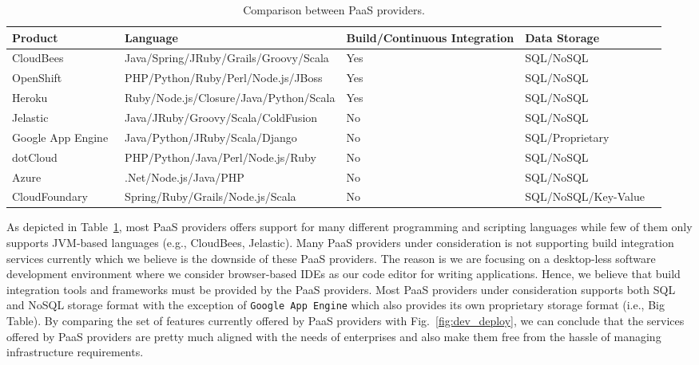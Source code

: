 \documentclass[11pt,fleqn,twoside]{article}
\begin{document}
\begin{table}[h]
\centering
\tiny {
\begin{tabular}{|p{2.3cm}|p{4.5cm}|p{2.5cm}|p{2.5cm}|p{1cm}|}
\hline
\tiny \textbf{Product} & \tiny \textbf{Language} & \tiny \textbf{Build/Continuous Integration} & \tiny \textbf{Data Storage}\\
\hline
CloudBees~\cite{CloudBees_url} & Java/Spring/JRuby/Grails/Groovy/Scala & Yes & SQL/NoSQL \\
\hline
OpenShift~\cite{OpenShift_url} & PHP/Python/Ruby/Perl/Node.js/JBoss & Yes & SQL/NoSQL \\
\hline
Heroku~\cite{Heroku_url} & Ruby/Node.js/Closure/Java/Python/Scala & Yes & SQL/NoSQL \\
\hline
Jelastic~\cite{jelastic_url} & Java/JRuby/Groovy/Scala/ColdFusion & No & SQL/NoSQL \\
\hline
Google App Engine~\cite{googleapp_url} & Java/Python/JRuby/Scala/Django & No & SQL/Proprietary \\
\hline
dotCloud~\cite{dotcloud_url} & PHP/Python/Java/Perl/Node.js/Ruby & No & SQL/NoSQL \\
\hline
Azure~\cite{azure_url} & .Net/Node.js/Java/PHP & No & SQL/NoSQL \\
\hline
CloudFoundary~\cite{CloudFoundry_url} & Spring/Ruby/Grails/Node.js/Scala & No & SQL/NoSQL/Key-Value \\
\hline
\end{tabular}
}
\caption{Comparison between PaaS providers.}
\label{PaaS_comparison}
\end{table}

As depicted in Table~\ref{PaaS_comparison}, most PaaS providers offers support for many different programming and scripting languages while few of them only supports JVM-based languages (e.g., CloudBees, Jelastic). Many PaaS providers under consideration is not supporting build integration services currently which we believe is the downside of these PaaS providers. The reason is we are focusing on a desktop-less software development environment where we consider browser-based IDEs as our code editor for writing applications. Hence, we believe that build integration tools and frameworks must be provided by the PaaS providers. Most PaaS providers under consideration supports both SQL and NoSQL storage format with the exception of \texttt{Google App Engine} which also provides its own proprietary storage format (i.e., Big Table). By comparing the set of features currently offered by PaaS providers with Fig.~\ref{fig:dev_deploy}, we can conclude that the services offered by PaaS providers are pretty much aligned with the needs of enterprises and also make them free from the hassle of managing infrastructure requirements.
\end{document}
